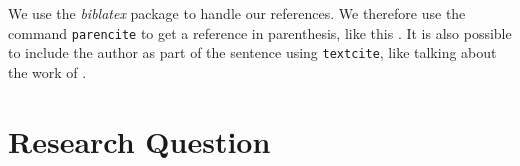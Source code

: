We use the \emph{biblatex} package to handle our references.  We therefore use the
command \texttt{parencite} to get a reference in parenthesis, like this
\parencite{goodfellow2016nips}.  It is also possible to include the author
as part of the sentence using \texttt{textcite}, like talking about
the work of \textcite{fedus2017many}.

\section{Research Question}


